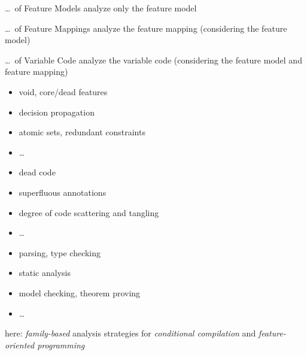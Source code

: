 \begin{frame}{\myframetitle}
	\begin{fancycolumns}[t,columns=3]
		\textbf{\lecturemodeling\partc}
		\begin{definition}{\ldots\ of Feature Models}
			analyze only the feature model
		\end{definition}
	\nextcolumn
		\textbf{\lectureanalyses\partb}
		\begin{definition}{\ldots\ of Feature Mappings}
			analyze the feature mapping (considering the feature model)
		\end{definition}
	\nextcolumn
		\textbf{\lectureanalyses\partc}
		\begin{definition}{\ldots\ of Variable Code}
			analyze the variable code (considering the feature model and feature mapping)
		\end{definition}
	\end{fancycolumns}
	\begin{fancycolumns}[t,columns=3]
		\begin{example}{}
			\begin{itemize}
				\item void, core/dead features
				\item decision propagation
				\item atomic sets, redundant constraints
				\item \ldots
			\end{itemize}
		\end{example}
	\nextcolumn
		\begin{example}{}
			\begin{itemize}
				\item dead code
				\item superfluous annotations
				\item degree of code scattering and tangling
				\item \ldots
			\end{itemize}
		\end{example}
	\nextcolumn
		\begin{example}{}
			\begin{itemize}
				\item parsing, type checking
				\item static analysis
				\item model checking, theorem proving
				\item \ldots
			\end{itemize}
		\end{example}
	\end{fancycolumns}
	\begin{fancycolumns}[t,columns=2,widths={32}]
	\nextcolumn
		\begin{note}{}
			here: \emph{family-based} analysis strategies for \emph{conditional compilation} and \emph{feature-oriented programming}
		\end{note}
	\end{fancycolumns}
\end{frame}